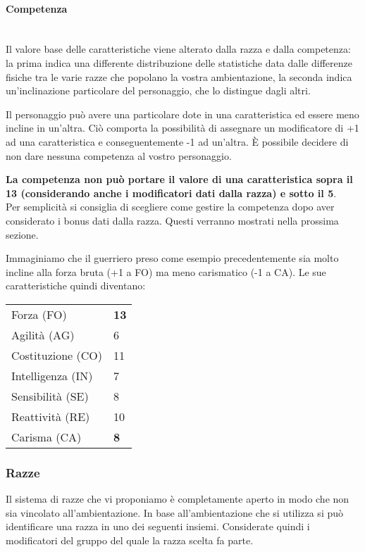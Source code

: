 \documentclass[../manuale_main.tex]{subfiles}
\begin{document}
 

\paragraph{Competenza}\mbox{}\\

Il valore base delle caratteristiche viene alterato dalla razza e dalla competenza: la prima indica una differente distribuzione delle statistiche data dalle differenze fisiche tra le varie razze che popolano la vostra ambientazione, la seconda indica un'inclinazione particolare del personaggio, che lo distingue dagli altri.

Il personaggio può avere una particolare dote in una caratteristica ed essere meno incline in un'altra. 
Ciò comporta la possibilità di assegnare un modificatore di +1 ad una caratteristica e conseguentemente -1 ad un’altra. 
È possibile decidere di non dare nessuna competenza al vostro personaggio.

\textbf{La competenza non può portare il valore di una caratteristica sopra il 13 (considerando anche i modificatori dati dalla razza) e sotto il 5}. \\
Per semplicità si consiglia di scegliere come gestire la competenza dopo aver considerato i bonus dati dalla razza. Questi verranno mostrati nella prossima sezione.

Immaginiamo che il guerriero preso come esempio precedentemente sia molto incline alla forza bruta (+1 a FO) ma meno carismatico (-1 a CA). 
Le sue caratteristiche quindi diventano:

\begin{tabular}{| l | l |}
\hline
Forza (FO)&\textbf{13}\\
Agilità (AG)&6\\
Costituzione (CO)&11\\
Intelligenza (IN)&7\\
Sensibilità (SE)&8\\
Reattività (RE)&10\\
Carisma (CA)&\textbf{8}\\
\hline
\end{tabular}

\subsubsection{Razze}
Il sistema di razze che vi proponiamo è completamente aperto in modo che non sia vincolato all'ambientazione.
In base all’ambientazione che si utilizza si può identificare una razza in uno dei seguenti insiemi. Considerate quindi i modificatori del gruppo del quale la razza scelta fa parte.
\end{document}
